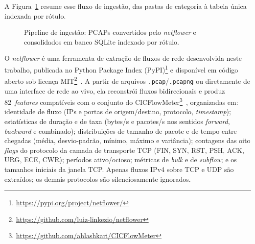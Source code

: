 \documentclass[12pt]{article}
\begin{document}
A Figura~\ref{fig:pipeline} resume esse fluxo de ingestão, das pastas de
categoria à tabela única indexada por rótulo.

\begin{figure}[ht]
\centering
{}
\caption{Pipeline de ingestão: PCAPs convertidos pelo \textit{netflower} e consolidados em banco SQLite indexado por rótulo.}
\label{fig:pipeline}
\end{figure}

O \textit{netflower} é uma
ferramenta de extração de fluxos de rede desenvolvida neste trabalho, publicada no
Python Package Index (PyPI)\footnote{\url{https://pypi.org/project/netflower/}} e
disponível em código aberto sob licença MIT\footnote{\url{https://github.com/luiz-linkezio/netflower}}~\cite{netflower}.
A partir de arquivos \texttt{.pcap}/\texttt{.pcapng} ou diretamente de uma interface
de rede ao vivo, ela reconstrói fluxos bidirecionais e produz 82~\textit{features}
compatíveis com o conjunto do CICFlowMeter\footnote{\url{https://github.com/ahlashkari/CICFlowMeter}}~\cite{cicflowmeter},
organizadas em: identidade de fluxo
(IPs e portas de origem/destino, protocolo, \textit{timestamp}); estatísticas de
duração e de taxa (bytes/s e pacotes/s nos sentidos \textit{forward},
\textit{backward} e combinado); distribuições de tamanho de pacote e de tempo
entre chegadas (média, desvio-padrão, mínimo, máximo e variância); contagens das
oito \textit{flags} do protocolo da camada de transporte TCP (FIN, SYN, RST, PSH, ACK, URG, ECE, CWR); períodos
ativo/ocioso; métricas de \textit{bulk} e de \textit{subflow}; e os tamanhos
iniciais da janela TCP. Apenas fluxos IPv4 sobre TCP e UDP são extraídos; os
demais protocolos são silenciosamente ignorados.
\end{document}
